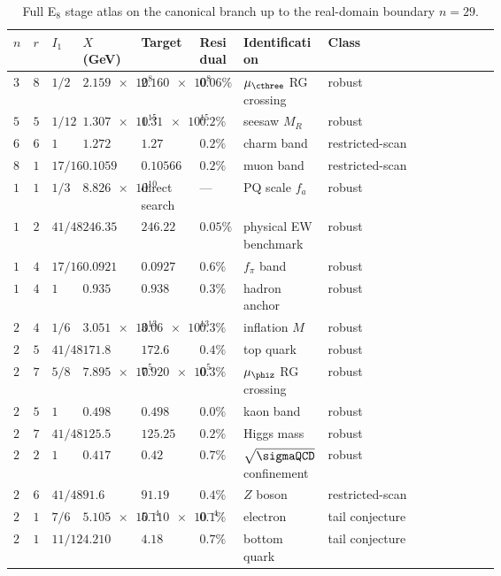 \begin{table}[H]
\centering
\scriptsize
\setlength{\tabcolsep}{2pt}
\begin{tabularx}{\linewidth}{@{}>{\centering\arraybackslash}p{0.035\linewidth}>{\centering\arraybackslash}p{0.035\linewidth}>{\raggedright\arraybackslash}p{0.065\linewidth}>{\raggedleft\arraybackslash}p{0.12\linewidth}>{\raggedleft\arraybackslash}p{0.12\linewidth}>{\raggedright\arraybackslash}p{0.09\linewidth}>{\raggedright\arraybackslash}p{0.17\linewidth}Y@{}}
\toprule
$n$ & $r$ & $I_1$ & $X$ (GeV) & Target & Residual & Identification & Class \\
\midrule
$3$ & $8$ & $1/2$ & $\num{2.159e8}$ & $\num{2.160e8}$ & $0.06\%$ & $\mu_{\cthree}$ RG crossing & robust \\
$5$ & $5$ & $1/12$ & $\num{1.307e15}$ & $\num{1.31e15}$ & $0.2\%$ & seesaw $M_R$ & robust \\
$6$ & $6$ & $1$ & $\num{1.272}$ & $\num{1.27}$ & $0.2\%$ & charm band & restricted-scan \\
$8$ & $1$ & $17/16$ & $\num{0.1059}$ & $\num{0.10566}$ & $0.2\%$ & muon band & restricted-scan \\
$10$ & $1$ & $1/3$ & $\num{8.826e10}$ & direct search & --- & PQ scale $f_a$ & robust \\
$12$ & $2$ & $41/48$ & $\num{246.35}$ & $\num{246.22}$ & $0.05\%$ & physical EW benchmark & robust \\
$14$ & $4$ & $17/16$ & $\num{0.0921}$ & $\num{0.0927}$ & $0.6\%$ & $f_\pi$ band & robust \\
$15$ & $4$ & $1$ & $\num{0.935}$ & $\num{0.938}$ & $0.3\%$ & hadron anchor & robust \\
$21$ & $4$ & $1/6$ & $\num{3.051e13}$ & $\num{3.06e13}$ & $0.3\%$ & inflation $M$ & robust \\
$21$ & $5$ & $41/48$ & $\num{171.8}$ & $\num{172.6}$ & $0.4\%$ & top quark & robust \\
$24$ & $7$ & $5/8$ & $\num{7.895e5}$ & $\num{7.920e5}$ & $0.3\%$ & $\mu_{\phiz}$ RG crossing & robust \\
$25$ & $5$ & $1$ & $\num{0.498}$ & $\num{0.498}$ & $0.0\%$ & kaon band & robust \\
$25$ & $7$ & $41/48$ & $\num{125.5}$ & $\num{125.25}$ & $0.2\%$ & Higgs mass & robust \\
$26$ & $2$ & $1$ & $\num{0.417}$ & $\num{0.42}$ & $0.7\%$ & $\sqrt{\sigmaQCD}$ confinement & robust \\
$27$ & $6$ & $41/48$ & $\num{91.6}$ & $\num{91.19}$ & $0.4\%$ & $Z$ boson & restricted-scan \\
$28$ & $1$ & $7/6$ & $\num{5.105e-4}$ & $\num{5.110e-4}$ & $0.1\%$ & electron & tail conjecture \\
$29$ & $1$ & $11/12$ & $\num{4.210}$ & $\num{4.18}$ & $0.7\%$ & bottom quark & tail conjecture \\
\bottomrule
\end{tabularx}
\caption{Full E$_8$ stage atlas on the canonical branch up to the real-domain boundary $n=29$.}
\label{tab:e8-full-atlas}
\end{table}

